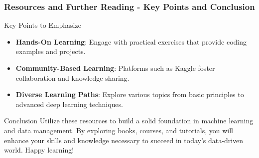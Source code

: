\documentclass[aspectratio=169]{beamer}
\begin{document}
\begin{frame}[fragile]
    \frametitle{Resources and Further Reading - Key Points and Conclusion}
    \begin{block}{Key Points to Emphasize}
        \begin{itemize}
            \item \textbf{Hands-On Learning}: Engage with practical exercises that provide coding examples and projects.
            \item \textbf{Community-Based Learning}: Platforms such as Kaggle foster collaboration and knowledge sharing.
            \item \textbf{Diverse Learning Paths}: Explore various topics from basic principles to advanced deep learning techniques.
        \end{itemize}
    \end{block}
    
    \vspace{0.5cm}
    
    \begin{block}{Conclusion}
        Utilize these resources to build a solid foundation in machine learning and data management. By exploring books, courses, and tutorials, you will enhance your skills and knowledge necessary to succeed in today’s data-driven world. Happy learning!
    \end{block}
\end{frame}
\end{document}
